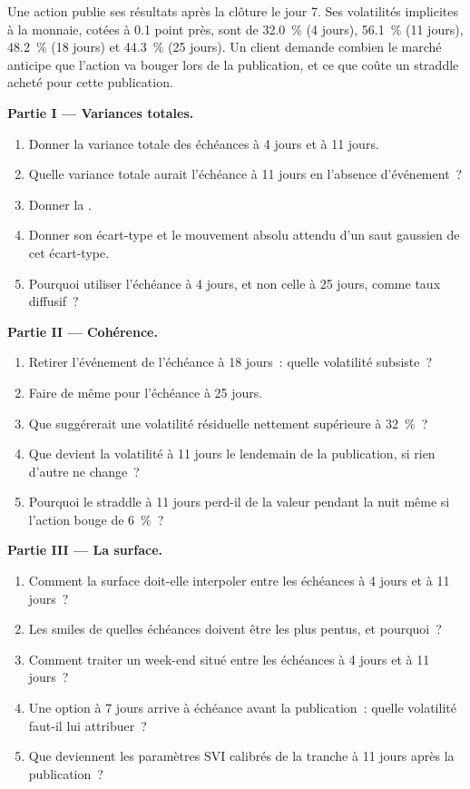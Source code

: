 \begin{problem}\label{pb:dv:parametrising-the-surface:1}
Une action publie ses résultats après la clôture le jour 7. Ses volatilités implicites à la monnaie, cotées à 0.1 point
près, sont de 32.0~\% (4 jours), 56.1~\% (11 jours), 48.2~\% (18 jours) et 44.3~\% (25 jours). Un client demande
combien le marché anticipe que l'action va bouger lors de la publication, et ce que coûte un straddle acheté
pour cette publication.

\medskip\noindent\textbf{Partie I --- Variances totales.}
\begin{enumerate}
\item Donner la variance totale des échéances à 4 jours et à 11 jours.
\item Quelle variance totale aurait l'échéance à 11 jours en l'absence d'événement~?
\item Donner la .
\item Donner son écart-type et le mouvement absolu attendu d'un saut gaussien de cet écart-type.
\item Pourquoi utiliser l'échéance à 4 jours, et non celle à 25 jours, comme taux diffusif~?
\end{enumerate}

\medskip\noindent\textbf{Partie II --- Cohérence.}
\begin{enumerate}[resume]
\item Retirer l'événement de l'échéance à 18 jours~: quelle volatilité subsiste~?
\item Faire de même pour l'échéance à 25 jours.
\item Que suggérerait une volatilité résiduelle nettement supérieure à 32~\%~?
\item Que devient la volatilité à 11 jours le lendemain de la publication, si rien d'autre ne change~?
\item Pourquoi le straddle à 11 jours perd-il de la valeur pendant la nuit même si l'action bouge de 6~\%~?
\end{enumerate}

\medskip\noindent\textbf{Partie III --- La surface.}
\begin{enumerate}[resume]
\item Comment la surface doit-elle interpoler entre les échéances à 4 jours et à 11 jours~?
\item Les smiles de quelles échéances doivent être les plus pentus, et pourquoi~?
\item Comment traiter un week-end situé entre les échéances à 4 jours et à 11 jours~?
\item Une option à 7 jours arrive à échéance avant la publication~: quelle volatilité faut-il lui attribuer~?
\item Que deviennent les paramètres SVI calibrés de la tranche à 11 jours après la publication~?
\end{enumerate}


\end{problem}
